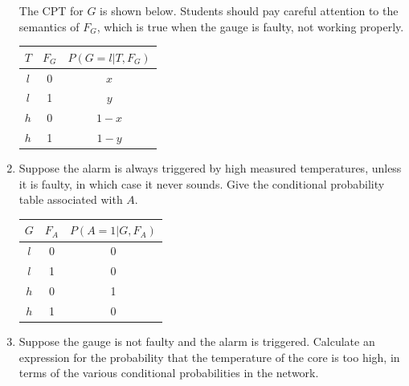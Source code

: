 \documentclass[11pt, a4paper]{article}
\begin{document}
\begin{enumerate}
    \begin{solution}
        The CPT for $G$ is shown below. Students should pay careful attention to the semantics of $F_G$, which is true when the gauge is faulty, \ie{} not working properly.
        \begin{table}[h!]
            \centering
            \begin{tabular}{cc|c}
                \toprule
                 $T$ & $F_G$ & $P(G = l | T, F_G)$ \\
                 \midrule
                 $l$ & 0 & $x$ \\
                 $l$ & 1 & $y$ \\
                 $h$ & 0 & $1 - x$ \\
                 $h$ & 1 & $1 - y$ \\
                 \bottomrule
            \end{tabular}
        \end{table}
    \end{solution}

    \item Suppose the alarm is always triggered by high measured temperatures, unless it is faulty, in which case it never sounds. Give the conditional probability table associated with $A$.

    \begin{solution}
        \begin{table}[h]
            \centering
            \begin{tabular}{cc|c}
                \toprule
                 $G$ & $F_A$ & $P(A = 1 | G, F_A)$ \\
                 \midrule
                 $l$ & 0 & 0 \\
                 $l$ & 1 & 0 \\
                 $h$ & 0 & 1 \\
                 $h$ & 1 & 0 \\
                 \bottomrule
            \end{tabular}
        \end{table}
    \end{solution}

    \item Suppose the gauge is not faulty and the alarm is triggered. Calculate an expression for the probability that the temperature of the core is too high, in terms of the various conditional probabilities in the network.


\end{enumerate}
\end{document}
